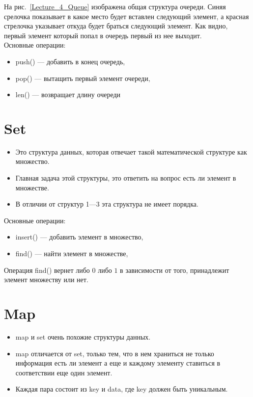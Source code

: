 \documentclass[12pt, twoside]{article}
\begin{document}
На рис.~\ref{Lecture_4_Queue} изображена общая структура очереди. Синяя срелочка показывает в какое место будет вставлен следующий элемент, а красная стрелочка указывает откуда будет браться следующий элемент. Как видно, первый элемент который попал в очередь первый из нее выходит.\\

Основные операции:
\begin{itemize}
	\item push() --- добавить в конец очередь,
	\item pop()  --- вытащить первый элемент очереди,
	\item len() --- возвращает длину очереди
\end{itemize}


\section{Set}
\begin{itemize}
	\item Это структура данных, которая отвечает такой математической структуре как множество.
	\item Главная задача этой структуры, это ответить на вопрос есть ли элемент в множестве.
	\item В отличии от структур 1---3 эта структура не имеет порядка.
\end{itemize}

Основные операции:
\begin{itemize}
	\item insert() --- добавить элемент в множество,
	\item find()  --- найти элемент в множестве,
\end{itemize}

Операция find() вернет либо $0$ либо $1$ в зависимости от того, принадлежит элемент множеству или нет.

\section{Map}
\begin{itemize}
	\item map и set очень похожие структуры данных.
	\item map отличается от set, только тем, что в нем храниться не только информация есть ли элемент а еще и каждому элементу ставиться в соответствии еще один элемент.
	\item Каждая пара состоит из key и data, где key должен быть уникальным.
\end{itemize}
\end{document}
